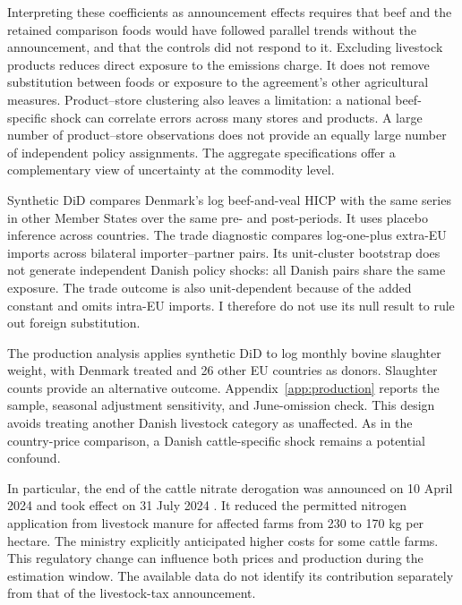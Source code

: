 \documentclass[11pt]{article}
\begin{document}
Interpreting these coefficients as announcement effects requires that beef and the retained comparison foods would have followed parallel trends without the announcement, and that the controls did not respond to it. Excluding livestock products reduces direct exposure to the emissions charge. It does not remove substitution between foods or exposure to the agreement's other agricultural measures. Product--store clustering also leaves a limitation: a national beef-specific shock can correlate errors across many stores and products. A large number of product--store observations does not provide an equally large number of independent policy assignments. The aggregate specifications offer a complementary view of uncertainty at the commodity level.

Synthetic DiD compares Denmark's log beef-and-veal HICP with the same series in other Member States over the same pre- and post-periods. It uses placebo inference across countries. The trade diagnostic compares log-one-plus extra-EU imports across bilateral importer--partner pairs. Its unit-cluster bootstrap does not generate independent Danish policy shocks: all Danish pairs share the same exposure. The trade outcome is also unit-dependent because of the added constant and omits intra-EU imports. I therefore do not use its null result to rule out foreign substitution.

The production analysis applies synthetic DiD to log monthly bovine slaughter weight, with Denmark treated and 26 other EU countries as donors. Slaughter counts provide an alternative outcome. Appendix~\ref{app:production} reports the sample, seasonal adjustment sensitivity, and June-omission check. This design avoids treating another Danish livestock category as unaffected. As in the country-price comparison, a Danish cattle-specific shock remains a potential confound.

In particular, the end of the cattle nitrate derogation was announced on 10 April 2024 and took effect on 31 July 2024 \citep{danishnitrates2024}. It reduced the permitted nitrogen application from livestock manure for affected farms from 230 to 170 kg per hectare. The ministry explicitly anticipated higher costs for some cattle farms. This regulatory change can influence both prices and production during the estimation window. The available data do not identify its contribution separately from that of the livestock-tax announcement.
\end{document}
